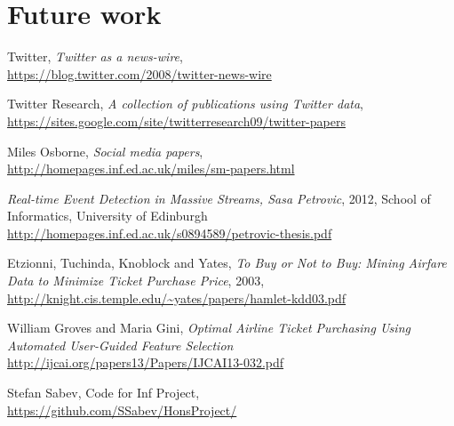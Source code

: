 \documentclass[minf,frontabs,twoside,singlespacing,parskip]{infthesis}
\begin{document}
\chapter{Future work}
\label{chap:future-work}




\begin{thebibliography}{10}

	Twitter, \emph{Twitter as a news-wire}, \\
	{\url{https://blog.twitter.com/2008/twitter-news-wire}}

	Twitter Research,
	\emph{A collection of publications using Twitter data}, \\
 	{\url{https://sites.google.com/site/twitterresearch09/twitter-papers}}

	Miles Osborne, \emph{Social media papers}, \\
	{\url{http://homepages.inf.ed.ac.uk/miles/sm-papers.html}}
	
  	\emph{Real-time Event Detection in Massive Streams, Sasa Petrovic}, 2012, School of Informatics, University of Edinburgh \\
	{\url{http://homepages.inf.ed.ac.uk/s0894589/petrovic-thesis.pdf}}
  
  
 	Etzionni, Tuchinda, Knoblock and Yates, \emph{To Buy or Not to Buy: Mining Airfare Data to Minimize Ticket Purchase Price}, 2003, \\
  	{\url{http://knight.cis.temple.edu/~yates/papers/hamlet-kdd03.pdf}}
	
	William Groves and Maria Gini, \emph{Optimal Airline Ticket Purchasing Using Automated User-Guided Feature Selection}
	{\url{http://ijcai.org/papers13/Papers/IJCAI13-032.pdf}}

	Stefan Sabev, Code for Inf Project,\\
	{\url{https://github.com/SSabev/HonsProject/}}

\end{thebibliography}
\end{document}

